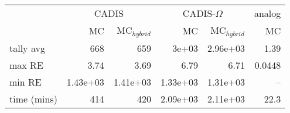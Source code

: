 \begin{tabular}{lrrrrr}
\toprule
{} & \multicolumn{2}{c}{CADIS}   & \multicolumn{2}{c}{CADIS-$\Omega$}  & analog \\
{} &    MC & MC$_{hybrid}$ &         MC & MC$_{hybrid}$ &     MC \\
\midrule
tally avg   &      668 &         659 &      3e+03 &    2.96e+03 &   1.39 \\
max RE      &     3.74 &        3.69 &       6.79 &        6.71 & 0.0448 \\
min RE      & 1.43e+03 &    1.41e+03 &   1.33e+03 &    1.31e+03 &    -- \\
time (mins) &      414 &         420 &   2.09e+03 &    2.11e+03 &   22.3 \\
\bottomrule
\end{tabular}
